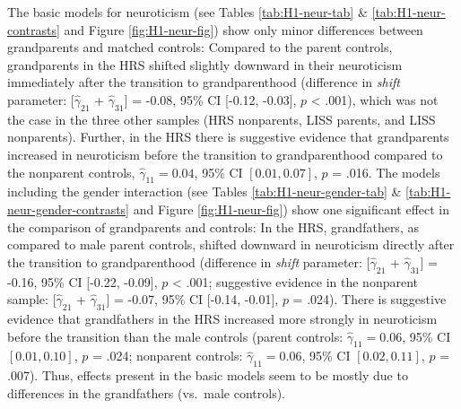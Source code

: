 \documentclass[
  english,
  man, noextraspace]{apa7}
\begin{document}
The basic models for neuroticism (see Tables \ref{tab:H1-neur-tab} \& \ref{tab:H1-neur-contrasts} and Figure \ref{fig:H1-neur-fig}) show only minor differences between grandparents and matched controls: Compared to the parent controls, grandparents in the HRS shifted slightly downward in their neuroticism immediately after the transition to grandparenthood (difference in \emph{shift} parameter: {[}\(\hat{\gamma}_{21}\) + \(\hat{\gamma}_{31}\){]} = -0.08, 95\% CI {[}-0.12, -0.03{]}, \(p\) \textless{} .001), which was not the case in the three other samples (HRS nonparents, LISS parents, and LISS nonparents). Further, in the HRS there is suggestive evidence that grandparents increased in neuroticism before the transition to grandparenthood compared to the nonparent controls, \(\hat{\gamma}_{11} = 0.04\), 95\% CI \([0.01, 0.07]\), \(p\) = .016. The models including the gender interaction (see Tables \ref{tab:H1-neur-gender-tab} \& \ref{tab:H1-neur-gender-contrasts} and Figure \ref{fig:H1-neur-fig}) show one significant effect in the comparison of grandparents and controls: In the HRS, grandfathers, as compared to male parent controls, shifted downward in neuroticism directly after the transition to grandparenthood (difference in \emph{shift} parameter: {[}\(\hat{\gamma}_{21}\) + \(\hat{\gamma}_{31}\){]} = -0.16, 95\% CI {[}-0.22, -0.09{]}, \(p\) \textless{} .001; suggestive evidence in the nonparent sample: {[}\(\hat{\gamma}_{21}\) + \(\hat{\gamma}_{31}\){]} = -0.07, 95\% CI {[}-0.14, -0.01{]}, \(p\) = .024). There is suggestive evidence that grandfathers in the HRS increased more strongly in neuroticism before the transition than the male controls (parent controls: \(\hat{\gamma}_{11} = 0.06\), 95\% CI \([0.01, 0.10]\), \(p\) = .024; nonparent controls: \(\hat{\gamma}_{11} = 0.06\), 95\% CI \([0.02, 0.11]\), \(p\) = .007). Thus, effects present in the basic models seem to be mostly due to differences in the grandfathers (vs.~male controls).\\
\end{document}
